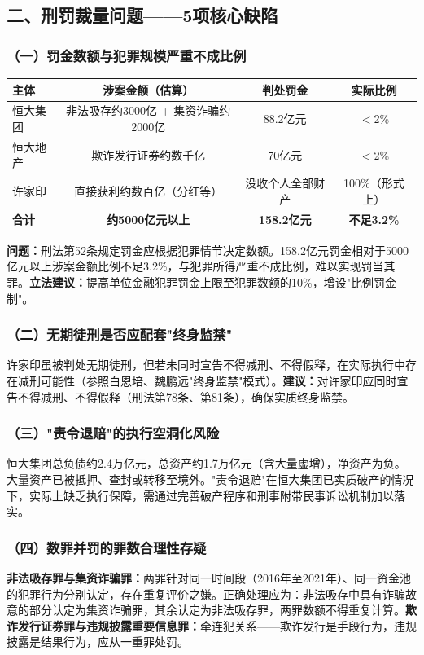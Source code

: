 \documentclass[11pt,a4paper,oneside,openany]{article}
\begin{document}
\subsection{二、刑罚裁量问题——5项核心缺陷}

\subsubsection{（一）罚金数额与犯罪规模严重不成比例}
\begin{threeparttable}
\caption{罚金与犯罪规模量化比例分析}
\begin{tabular}{lccc}
\toprule
\textbf{主体} & \textbf{涉案金额（估算）} & \textbf{判处罚金} & \textbf{实际比例} \\
\midrule
恒大集团 & 非法吸存约3000亿 + 集资诈骗约2000亿 & 88.2亿元 & $<$2\% \\
恒大地产 & 欺诈发行证券约数千亿 & 70亿元 & $<$2\% \\
许家印 & 直接获利约数百亿（分红等） & 没收个人全部财产 & 100\%（形式上） \\
\midrule
\textbf{合计} & \textbf{约5000亿元以上} & \textbf{158.2亿元} & \textbf{不足3.2\%} \\
\bottomrule
\end{tabular}
\end{threeparttable}

\textbf{问题：}刑法第52条规定罚金应根据犯罪情节决定数额。158.2亿元罚金相对于5000亿元以上涉案金额比例不足3.2\%，与犯罪所得严重不成比例，难以实现罚当其罪。\textbf{立法建议：}提高单位金融犯罪罚金上限至犯罪数额的10\%，增设"比例罚金制"。

\subsubsection{（二）无期徒刑是否应配套"终身监禁"}
许家印虽被判处无期徒刑，但若未同时宣告不得减刑、不得假释，在实际执行中存在减刑可能性（参照白恩培、魏鹏远"终身监禁"模式）。\textbf{建议：}对许家印应同时宣告不得减刑、不得假释（刑法第78条、第81条），确保实质终身监禁。

\subsubsection{（三）"责令退赔"的执行空洞化风险}
恒大集团总负债约2.4万亿元，总资产约1.7万亿元（含大量虚增），净资产为负。大量资产已被抵押、查封或转移至境外。"责令退赔"在恒大集团已实质破产的情况下，实际上缺乏执行保障，需通过完善破产程序和刑事附带民事诉讼机制加以落实。

\subsubsection{（四）数罪并罚的罪数合理性存疑}
\textbf{非法吸存罪与集资诈骗罪：}两罪针对同一时间段（2016年至2021年）、同一资金池的犯罪行为分别认定，存在重复评价之嫌。正确处理应为：非法吸存中具有诈骗故意的部分认定为集资诈骗罪，其余认定为非法吸存罪，两罪数额不得重复计算。\textbf{欺诈发行证券罪与违规披露重要信息罪：}牵连犯关系——欺诈发行是手段行为，违规披露是结果行为，应从一重罪处罚。
\end{document}
